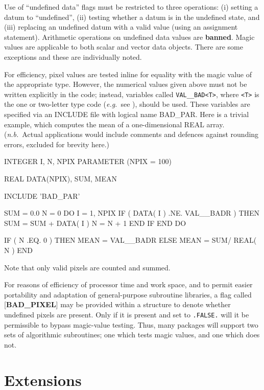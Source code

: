 \documentclass[twoside,11pt,nolof,noabs]{starlink}
\begin{document}
Use of ``undefined data'' flags must be restricted to three operations:
(i) setting a datum to ``undefined'', (ii) testing whether a datum is
in the undefined state, and (iii) replacing an undefined datum with a
valid value (using an assignment statement).  Arithmetic operations on
undefined data values are \textbf{banned}.  Magic values are applicable to both
scalar and vector data objects.  There are some exceptions and these
are individually noted.

For efficiency, pixel values are tested inline for equality with the
magic value of the appropriate type.  However, the numerical values
given above must not be written explicitly in the code; instead,
variables called \texttt{VAL\_\_BAD<T>}, where \texttt{<T>} is the one or two-letter
type code (\textit{e.g.}\  see ), should
be used.  These variables are specified
via an INCLUDE file with logical name BAD\_PAR.  Here is a trivial
example, which computes the mean of a one-dimensional REAL array.
(\textit{n.b.}\ Actual applications would include comments and
defences against rounding errors, excluded for brevity here.)

\goodbreak
\begin{terminalv}
      INTEGER I, N, NPIX
      PARAMETER (NPIX = 100)

      REAL DATA(NPIX), SUM, MEAN

      INCLUDE 'BAD_PAR'

      SUM = 0.0
      N = 0
      DO I = 1, NPIX
         IF ( DATA( I ) .NE. VAL__BADR ) THEN
            SUM = SUM + DATA( I )
            N = N + 1
         END IF
      END DO

      IF ( N .EQ. 0 ) THEN
         MEAN = VAL__BADR
      ELSE
         MEAN = SUM/ REAL( N )
      END
\end{terminalv}

Note that only valid pixels are counted and summed.

For reasons of efficiency of processor time and work space, and to
permit easier portability and adaptation of general-purpose subroutine
libraries, a flag called {[}\textbf{BAD\_PIXEL}{]} may be
provided within a structure
to denote whether undefined pixels are present.  Only if it is present
and set to \texttt{.FALSE.} will it be
permissible to bypass magic-value testing.  Thus, many packages
will support two sets of algorithmic subroutines; one which
tests magic values, and one which does not.

\section{Extensions\label{se:exten}}
\end{document}
